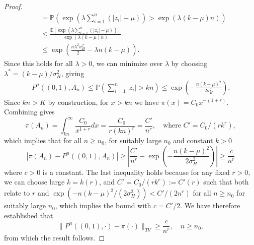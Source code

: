\documentclass[10pt,a4paper]{amsart}
\begin{document}
\begin{proof}
\begin{equation}
\begin{aligned}
    &= \mathbb{P}\left(\exp\left(\lambda \sum_{i=1}^n(|z_i| - \mu)\right) >\exp(\lambda(k-\mu)n)\right)\\
    &\le \frac{\mathbb{E}\left[\exp\left(\lambda \sum_{i=1}^n(|z_i| - \mu)\right)\right]}{\exp(\lambda(k-\mu)n)}\\
    &\le \exp\left(\frac{n\lambda^2\sigma_H^2}{2} - \lambda n (k-\mu)\right).
\end{aligned}
\end{equation}
Since this holds for all $\lambda>0$, we can minimize over $\lambda$ by choosing $\lambda^* = (k-\mu)/\sigma_H^2$, giving
\begin{align}
    P^n((0,1),A_n) \le  \mathbb{P}\left(\sum_{i=1}^n|z_i| >kn\right)\le \exp\left(-\frac{n(k-\mu)^2}{2\sigma_H^2}\right).
\end{align}
Since $kn>K$ by construction, for $x>kn$ we have $\pi(x) = C_0 x^{-(1+r)}$. Combining gives
\begin{equation}
    \pi(A_n) = \int_{kn}^\infty \frac{C_0}{x^{1+r}}  dx = \frac{C_0}{r(kn)^r} = \frac{C'}{n^r}, \quad \text{where } C' = C_0/(rk^r),
\end{equation}  
which implies that for all $n\ge n_0$, for suitably large $n_0$ and constant $k>0$
\begin{equation}
    |\pi(A_n) - P^n((0,1),A_n)| \ge \left|\frac{C'}{n^r} - \exp\left(-\frac{n(k-\mu)^2}{2\sigma_H^2}\right)\right| \ge \frac{c}{n^r}
\end{equation}
where $c>0$ is a constant. The last inequality holds because for any fixed $r>0$, we can choose large $k=k(r)$, and $C' = C_0/(rk^r):= C'(r)$ such that both relate to $r$ and $\exp(-n(k-\mu)^2/(2\sigma_H^2)) < C'/(2n^r)$ for all $n\ge n_0$ for suitably large $n_0$, which implies the bound with $c = C'/2$.  We have therefore established that
\begin{equation}
    \|P^n((0,1),\cdot) - \pi(\cdot)\|_{TV} \ge \frac{c}{n^r}, \quad n\ge n_0,
\end{equation}
from which the result follows.
\end{proof}
\end{document}
